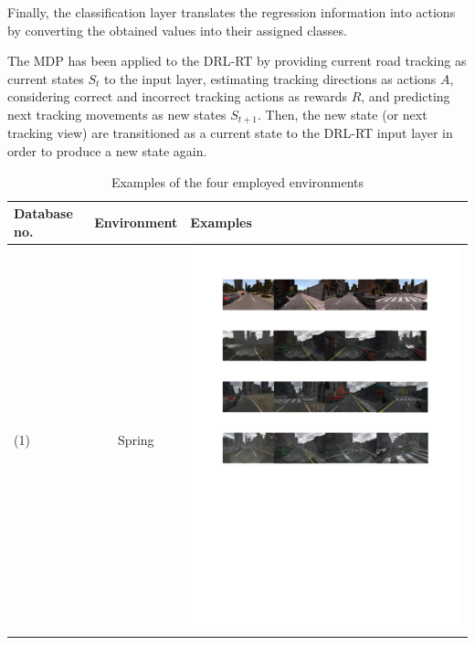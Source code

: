 \documentclass[conference]{IEEEtran}
\begin{document}
		Finally, the classification layer translates the regression information into actions by converting the obtained values into their assigned classes.
		
		The MDP has been applied to the DRL-RT by providing current road tracking as current states $S_t$ to the input layer, estimating tracking directions as actions $A$, considering correct and incorrect tracking actions as rewards $R$, and predicting next tracking movements as new states $S_{t+1}$. Then, the new state (or next tracking view) are transitioned as a current state to the DRL-RT input layer in order to produce a new state again.
		\begin{table}[!t]
			\centering
			\caption{Examples of the four employed environments}
			\label{Table:Environments_Examples}
			\begin{tabular}{|C{1cm}|c|C{13.5cm}|}
				\hline
				\textbf{Database no.} & \textbf{Environment} & \textbf{Examples} \\ \hline
				(1)	& Spring & \begin{minipage}{.9\textwidth}\includegraphics[scale=.8,trim=2cm 24.5cm 2cm 2.5cm,clip]{examples.pdf}\end{minipage} \\ \hline

\end{tabular}
\end{table}
\end{document}
